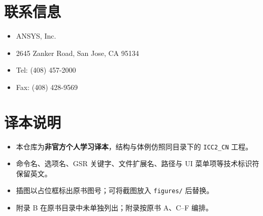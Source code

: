 \section*{联系信息}

\begin{itemize}
  \item ANSYS, Inc.
  \item 2645 Zanker Road, San Jose, CA 95134
  \item Tel: (408) 457-2000
  \item Fax: (408) 428-9569
\end{itemize}

\section*{译本说明}

\begin{itemize}
  \item 本仓库为\textbf{非官方个人学习译本}，结构与体例仿照同目录下的 \texttt{ICC2\_CN} 工程。
  \item 命令名、选项名、GSR 关键字、文件扩展名、路径与 UI 菜单项等技术标识符保留英文。
  \item 插图以占位框标出原书图号；可将截图放入 \texttt{figures/} 后替换。
  \item 附录 B 在原书目录中未单独列出；附录按原书 A、C--F 编排。
\end{itemize}
